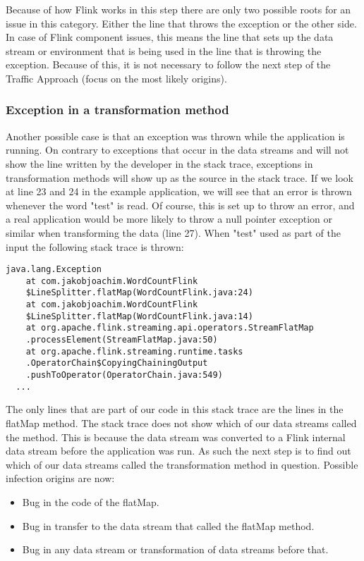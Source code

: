 Because of how Flink works in this step there are only two possible roots for an issue in this category. Either the line that throws the exception or the other side. In case of Flink component issues, this means the line that sets up the data stream or environment that is being used in the line that is throwing the exception. Because of this, it is not necessary to follow the next step of the Traffic Approach (focus on the most likely origins).

\subsubsection{Exception in a transformation method}
Another possible case is that an exception was thrown while the application is running. On contrary to exceptions that occur in the data streams and will not show the line written by the developer in the stack trace, exceptions in transformation methods will show up as the source in the stack trace. If we look at line 23 and 24 in the example application, we will see that an error is thrown whenever the word "test" is read. Of course, this is set up to throw an error, and a real application would be more likely to throw a null pointer exception or similar when transforming the data (line 27). When "test" used as part of the input the following stack trace is thrown:

\begin{lstlisting}[caption={Exception in Transformation}]
java.lang.Exception
    at com.jakobjoachim.WordCountFlink
    $LineSplitter.flatMap(WordCountFlink.java:24)
    at com.jakobjoachim.WordCountFlink
    $LineSplitter.flatMap(WordCountFlink.java:14)
    at org.apache.flink.streaming.api.operators.StreamFlatMap
    .processElement(StreamFlatMap.java:50)
    at org.apache.flink.streaming.runtime.tasks
    .OperatorChain$CopyingChainingOutput
    .pushToOperator(OperatorChain.java:549)
  ...
\end{lstlisting}

The only lines that are part of our code in this stack trace are the lines in the flatMap method. The stack trace does not show which of our data streams called the method. This is because the data stream was converted to a Flink internal data stream before the application was run. As such the next step is to find out which of our data streams called the transformation method in question. Possible infection origins are now:

\begin{itemize}
  \item Bug in the code of the flatMap.
  \item Bug in transfer to the data stream that called the flatMap method.
  \item Bug in any data stream or transformation of data streams before that.
\end{itemize}

